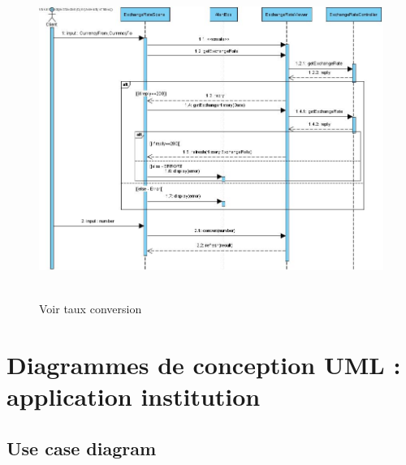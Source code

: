 \documentclass[]{report}
\begin{document}
\newpage

\begin{figure}[h!]
	\hbox{
		\centering\includegraphics[width=\linewidth]{img/Sequence 3 - Extension 2.jpg}
	}
	\caption{Voir taux conversion}
\end{figure}

\newpage



\section{Diagrammes de conception UML : application institution}



\subsection{Use case diagram}
\end{document}

